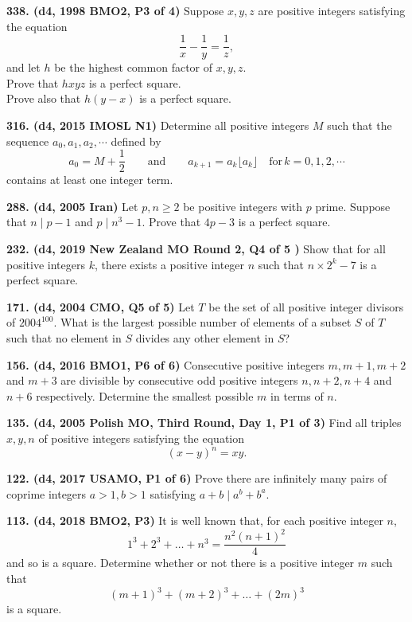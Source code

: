 \documentclass{article}
\begin{document}
\textbf{338. (\color{red}d4\color{black}, 1998 BMO2, P3 of 4)} Suppose $x, y, z$ are positive integers satisfying the equation \begin{equation*}\frac{1}{x} - \frac{1}{y} = \frac{1}{z},\end{equation*} and let $h$ be the highest common factor of $x,y,z$.\\ Prove that $hxyz$ is a perfect square.\\ Prove also that $h(y-x)$ is a perfect square.

\textbf{316. (\color{red}d4\color{black}, 2015 IMOSL N1)} Determine all positive integers $M$ such that the sequence $a_0, a_1, a_2, \cdots$ defined by\[ a_0 = M + \frac{1}{2}   \qquad  \textrm{and} \qquad    a_{k+1} = a_k\lfloor a_k \rfloor   \quad \textrm{for} \, k = 0, 1, 2, \cdots \]contains at least one integer term.

\textbf{288. (\color{red}d4\color{black}, 2005 Iran)} Let $p, n \geq 2$ be positive integers with $p$ prime. Suppose that $n \mid p - 1$ and $p \mid n^{3} - 1.$ Prove that $4p - 3$ is a perfect square.

\textbf{232. (\color{red}d4\color{black}, 2019 New Zealand MO Round 2, Q4 of 5     )} Show that for all positive integers $k$, there exists a positive integer $n$ such that $n \times 2^k - 7$ is a perfect square.

\textbf{171. (\color{red}d4\color{black}, 2004 CMO, Q5 of 5)} Let \(T\) be the set of all positive integer divisors of \(2004^{100}\). What is the largest possible number of elements of a subset \(S\) of \(T\) such that no element in \(S\) divides any other element in \(S\)?

\textbf{156. (\color{red}d4\color{black}, 2016 BMO1, P6 of 6)} Consecutive positive integers \(m, m+1, m+2\) and \(m+3\) are divisible by consecutive odd positive integers \(n, n+2, n+4\) and \(n+6\) respectively. Determine the smallest possible \(m\) in terms of \(n\).

\textbf{135. (\color{red}d4\color{black}, 2005 Polish MO, Third Round, Day 1, P1 of 3)} Find all triples \(x,y,n\) of positive integers satisfying the equation \[(x-y)^n = xy.\]

\textbf{122. (\color{red}d4\color{black}, 2017 USAMO, P1 of 6)} Prove there are infinitely many pairs of coprime integers $a>1, b>1$ satisfying $a+b \mid a^b + b^a.$

\textbf{113. (\color{red}d4\color{black}, 2018 BMO2, P3)} It is well known that, for each positive integer \(n\),
\[1^3 + 2^3 + \dots + n^3 = \frac{n^2(n+1)^2}{4}\]
and so is a square. Determine whether or not there is a positive integer \(m\) such that
\[(m+1)^3 + (m+2)^3 + \dots + (2m)^3\]
is a square.
\end{document}
